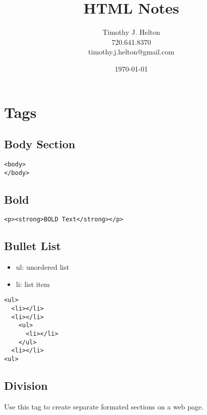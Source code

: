 \documentclass{article}
\newcommand{\mytitle}{HTML Notes}
\begin{document}
\author{Timothy J. Helton\\720.641.8370\\timothy.j.helton@gmail.com}
\date{\today}
\title{\mytitle}

\maketitle
\newpage

\tableofcontents
\newpage

\listoffigures
\listoftables
\newpage

\section{Tags}

\subsection{Body Section}
\begin{lstlisting}
<body>
</body>
\end{lstlisting}

\subsection{Bold}
\begin{lstlisting}
<p><strong>BOLD Text</strong></p>
\end{lstlisting}

\subsection{Bullet List}
\begin{itemize}
  \item ul: unordered list
  \item li: list item
\end{itemize}

\begin{lstlisting}
<ul>
  <li></li>
  <li></li>
    <ul>
      <li></li>
    </ul>
  <li></li>
<ul>
\end{lstlisting}

\subsection{Division}
Use this tag to create separate formated sections on a web page.
\end{document}
